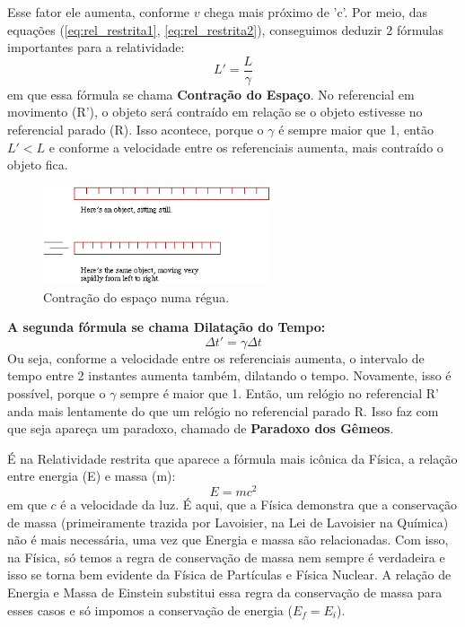 \documentclass[12pt]{extarticle}
\newcommand{\<}{\langle}
\renewcommand{\>}{\rangle}
\theoremstyle{definition}
\begin{document}
Esse fator ele aumenta, conforme $v$ chega mais próximo de 'c'. Por meio, das equações (\ref{eq:rel_restrita1}, \ref{eq:rel_restrita2}), conseguimos deduzir 2 fórmulas importantes para a relatividade:
\begin{equation}
    L' = \frac{L}{\gamma}
\end{equation}
\noindent em que essa fórmula se chama \textbf{Contração do Espaço}. No referencial em movimento (R'), o objeto será contraído em relação se o objeto estivesse no referencial parado (R). Isso acontece, porque o $\gamma$ é sempre maior que 1, então $L'< L$ e conforme a velocidade entre os referenciais aumenta, mais contraído o objeto fica.
\begin{figure}[H]
    \centering
    \includegraphics[width=0.6\textwidth]{ruler.png}
    \caption{Contração do espaço numa régua.}
    \label{fig:space_contraction}
\end{figure}

\textbf{A segunda fórmula se chama Dilatação do Tempo:}
\begin{equation}
    \Delta t' = \gamma \Delta t
\end{equation}
Ou seja, conforme a velocidade entre os referenciais aumenta, o intervalo de tempo entre 2 instantes aumenta também, dilatando o tempo. Novamente, isso é possível, porque o $\gamma$ sempre é maior que 1. Então, um relógio no referencial R' anda mais lentamente do que um relógio no referencial parado R. Isso faz com que seja apareça um paradoxo, chamado de \textbf{Paradoxo dos Gêmeos}.

É na Relatividade restrita que aparece a fórmula mais icônica da Física, a relação entre energia (E) e massa (m):
\begin{equation}
    E=mc^2
\end{equation}
\noindent em que $c$ é a velocidade da luz. É aqui, que a Física demonstra que a conservação de massa (primeiramente trazida por Lavoisier, na Lei de Lavoisier na Química) não é mais necessária, uma vez que Energia e massa são relacionadas. Com isso, na Física, só temos a regra de conservação de massa nem sempre é verdadeira e isso se torna bem evidente da Física de Partículas e Física Nuclear. A relação de Energia e Massa de Einstein substitui essa regra da conservação de massa para esses casos e só impomos a conservação de energia ($E_f= E_i$).
\end{document}
